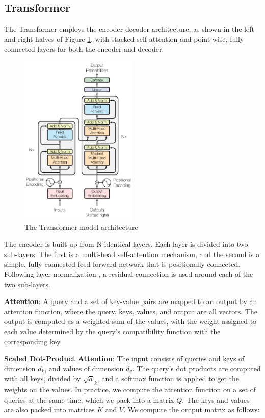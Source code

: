 \subsection{Transformer}

The Transformer employs the encoder-decoder architecture, as shown in the left and right halves of Figure \ref{transformer_blocks}, with stacked self-attention and point-wise, fully connected layers for both the encoder and decoder.

\begin{figure}[!h]
    \centering
    \includegraphics[width=0.5\textwidth]{figures/transformer_blocks.PNG}
    \caption{The Transformer model architecture \cite{Transformer}}
    \label{transformer_blocks}
\end{figure}

The encoder is built up from N identical layers. 
Each layer is divided into two sub-layers. 
The first is a multi-head self-attention mechanism, and the second is a simple, fully connected feed-forward network that is positionally connected. 
Following layer normalization \cite{layer_normalization}, a residual connection \cite{DeepResidualLearning} is used around each of the two sub-layers.

\textbf{Attention}: A query and a set of key-value pairs are mapped to an output by an attention function, where the query, keys, values, and output are all vectors. 
The output is computed as a weighted sum of the values, with the weight assigned to each value determined by the query's compatibility function with the corresponding key.

\textbf{Scaled Dot-Product Attention}: The input consists of
queries and keys of dimension $d_{k}$, and values of dimension $d_{v}$.
The query's dot products are computed with all keys, divided by $\sqrt d_{k}$, and a softmax function is applied to get the weights on the values.
In practice, we compute the attention function on a set of queries at the same time, which we pack into a matrix $Q$. 
The keys and values are also packed into matrices $K$ and $V$. 
We compute the output matrix as follows:


